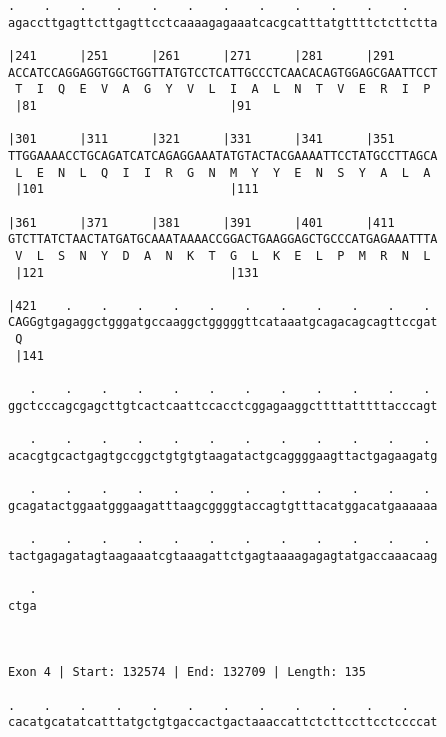 \documentclass{article}
\begin{document}
\begin{Verbatim}
.    .    .    .    .    .    .    .    .    .    .    .    
agaccttgagttcttgagttcctcaaaagagaaatcacgcatttatgttttctcttctta
                                                            
|241      |251      |261      |271      |281      |291      
ACCATCCAGGAGGTGGCTGGTTATGTCCTCATTGCCCTCAACACAGTGGAGCGAATTCCT
 T  I  Q  E  V  A  G  Y  V  L  I  A  L  N  T  V  E  R  I  P 
 |81                           |91                          
  
|301      |311      |321      |331      |341      |351      
TTGGAAAACCTGCAGATCATCAGAGGAAATATGTACTACGAAAATTCCTATGCCTTAGCA
 L  E  N  L  Q  I  I  R  G  N  M  Y  Y  E  N  S  Y  A  L  A 
 |101                          |111                         
  
|361      |371      |381      |391      |401      |411      
GTCTTATCTAACTATGATGCAAATAAAACCGGACTGAAGGAGCTGCCCATGAGAAATTTA
 V  L  S  N  Y  D  A  N  K  T  G  L  K  E  L  P  M  R  N  L 
 |121                          |131                         
  
|421    .    .    .    .    .    .    .    .    .    .    . 
CAGGgtgagaggctgggatgccaaggctgggggttcataaatgcagacagcagttccgat
 Q                                                          
 |141                                                       
  
   .    .    .    .    .    .    .    .    .    .    .    . 
ggctcccagcgagcttgtcactcaattccacctcggagaaggcttttatttttacccagt
                                                            
   .    .    .    .    .    .    .    .    .    .    .    . 
acacgtgcactgagtgccggctgtgtgtaagatactgcaggggaagttactgagaagatg
                                                            
   .    .    .    .    .    .    .    .    .    .    .    . 
gcagatactggaatgggaagatttaagcggggtaccagtgtttacatggacatgaaaaaa
                                                            
   .    .    .    .    .    .    .    .    .    .    .    . 
tactgagagatagtaagaaatcgtaaagattctgagtaaaagagagtatgaccaaacaag
                                                            
   .
ctga
    
    
 
Exon 4 | Start: 132574 | End: 132709 | Length: 135
 
.    .    .    .    .    .    .    .    .    .    .    .    
cacatgcatatcatttatgctgtgaccactgactaaaccattctcttccttcctccccat
                                                            

\end{Verbatim}
\end{document}
